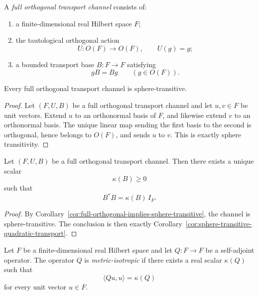 \begin{definition}
\label{def:full-orthogonal-transport-channel}
A \emph{full orthogonal transport channel} consists of:
\begin{enumerate}[label=(\roman*), leftmargin=2em, itemsep=0.2em]
\item a finite-dimensional real Hilbert space $F$;
\item the tautological orthogonal action
      \[
      U:O(F)\to O(F),
      \qquad
      U(g)=g;
      \]
\item a bounded transport base $B:F\to F$ satisfying
      \[
      gB=Bg
      \qquad(g\in O(F)).
      \]
\end{enumerate}
\end{definition}

\begin{corollary}
\label{cor:full-orthogonal-implies-sphere-transitive}
Every full orthogonal transport channel is sphere-transitive.
\end{corollary}

\begin{proof}
Let $(F,U,B)$ be a full orthogonal transport channel and let $u,v\in F$ be unit
vectors. Extend $u$ to an orthonormal basis of $F$, and likewise extend $v$ to
an orthonormal basis. The unique linear map sending the first basis to the
second is orthogonal, hence belongs to $O(F)$, and sends $u$ to $v$. This is
exactly sphere transitivity.
\end{proof}

\begin{corollary}
\label{cor:full-orthogonal-quadratic-transport}
Let $(F,U,B)$ be a full orthogonal transport channel. Then there exists a
unique scalar
\[
\kappa(B)\ge 0
\]
such that
\[
B^*B=\kappa(B)\,I_F.
\]
\end{corollary}

\begin{proof}
By Corollary~\ref{cor:full-orthogonal-implies-sphere-transitive}, the channel
is sphere-transitive. The conclusion is then exactly
Corollary~\ref{cor:sphere-transitive-quadratic-transport}.
\end{proof}

\begin{definition}
\label{def:metric-isotropic-quadratic-transport}
Let $F$ be a finite-dimensional real Hilbert space and let $Q:F\to F$ be a
self-adjoint operator. The operator $Q$ is \emph{metric-isotropic} if there
exists a real scalar $\kappa(Q)$ such that
\[
\langle Qu,u\rangle=\kappa(Q)
\]
for every unit vector $u\in F$.
\end{definition}

